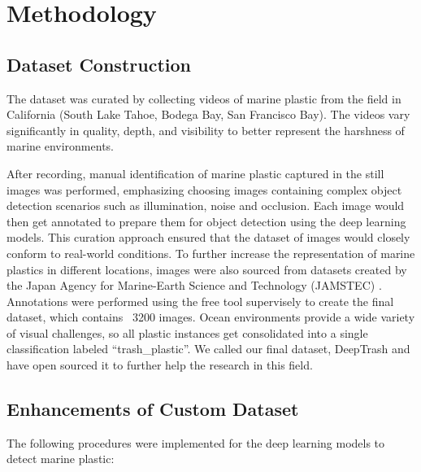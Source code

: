 \documentclass[a4paper,fleqn]{cas-dc}
\begin{document}
\section{Methodology}


\subsection{Dataset Construction}

The dataset was curated by collecting videos of marine plastic from the field in California (South Lake Tahoe, Bodega Bay, San Francisco Bay). The videos vary significantly in quality, depth, and visibility to better represent the harshness of marine environments.

After recording, manual identification of marine plastic captured in the still images was performed, emphasizing choosing images containing complex object detection scenarios such as illumination, noise and occlusion. Each image would then get annotated to prepare them for object detection using the deep learning models. This curation approach ensured that the dataset of images would closely conform to real-world conditions.
To further increase the representation of marine plastics in different locations, images were also sourced from datasets created by the Japan Agency for Marine-Earth Science and Technology (JAMSTEC) \cite{JAMSTEC}. 
Annotations were performed using the free tool supervisely \cite{drozdov} to create the final dataset, which contains ~3200 images. Ocean environments provide a wide variety of visual challenges, so all plastic instances get consolidated into a single classification labeled “trash\_plastic”. We called our final dataset, DeepTrash \cite{tata_gautam_2021_5562940} and have open sourced it to further help the research in this field.

\subsection{Enhancements of Custom Dataset}

The following procedures were implemented for the deep learning models to detect marine plastic:
\end{document}
